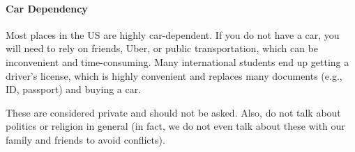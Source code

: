 \documentclass[oneside,11pt,dvipsnames]{book}
\begin{document}
  \paragraph{Car Dependency} Most places in the US are highly car-dependent. If you do not have a car, you will need to rely on friends, Uber, or public transportation, which can be inconvenient and time-consuming. Many international students end up getting a driver's license, which is highly convenient and replaces many documents (e.g., ID, passport) and buying a car.


  These are considered private and should not be asked.  Also, do not talk about politics or religion in general (in fact, we do not even talk about these with our family and friends to avoid conflicts).  
  
  
  
  



\end{document}
